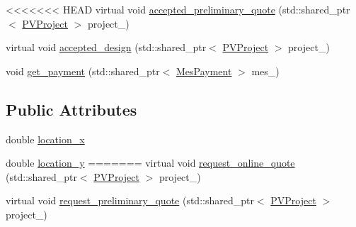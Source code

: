 {\bf }\par
\begin{DoxyCompactItemize}
\item 
<<<<<<< HEAD
virtual void \hyperlink{classsolar__core_1_1_s_e_i_ad683e480828c042d311a18cefbf2e95d}{accepted\+\_\+preliminary\+\_\+quote} (std\+::shared\+\_\+ptr$<$ \hyperlink{classsolar__core_1_1_p_v_project}{P\+V\+Project} $>$ project\+\_\+)
\end{DoxyCompactItemize}

{\bf }\par
\begin{DoxyCompactItemize}
\item 
virtual void \hyperlink{classsolar__core_1_1_s_e_i_a007004337169bac4c67b66e37ca89767}{accepted\+\_\+design} (std\+::shared\+\_\+ptr$<$ \hyperlink{classsolar__core_1_1_p_v_project}{P\+V\+Project} $>$ project\+\_\+)
\end{DoxyCompactItemize}

{\bf }\par
\begin{DoxyCompactItemize}
\item 
void \hyperlink{classsolar__core_1_1_s_e_i_a7f24aa13f3d62ec8890f526e12a3351c}{get\+\_\+payment} (std\+::shared\+\_\+ptr$<$ \hyperlink{classsolar__core_1_1_mes_payment}{Mes\+Payment} $>$ mes\+\_\+)
\end{DoxyCompactItemize}

\subsection*{Public Attributes}
{\bf }\par
\begin{DoxyCompactItemize}
\item 
double \hyperlink{classsolar__core_1_1_s_e_i_a3de17f788667889770edaf7dc0fc054d}{location\+\_\+x}
\item 
double \hyperlink{classsolar__core_1_1_s_e_i_a5fc331197d08788392c3af1903f25763}{location\+\_\+y}
=======
virtual void \hyperlink{classsolar__core_1_1_s_e_i_a704af1e2cacd1aba86d5ac406f2231ce}{request\+\_\+online\+\_\+quote} (std\+::shared\+\_\+ptr$<$ \hyperlink{classsolar__core_1_1_p_v_project}{P\+V\+Project} $>$ project\+\_\+)
\item 
virtual void \hyperlink{classsolar__core_1_1_s_e_i_aa34d9c40613ff61fc0c8c911e0734441}{request\+\_\+preliminary\+\_\+quote} (std\+::shared\+\_\+ptr$<$ \hyperlink{classsolar__core_1_1_p_v_project}{P\+V\+Project} $>$ project\+\_\+)
\end{DoxyCompactItemize}

